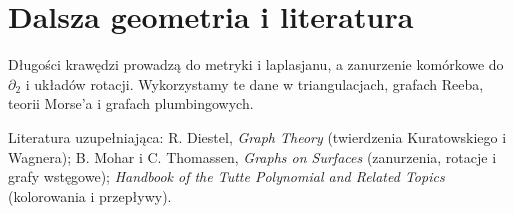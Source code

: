 \section*{Dalsza geometria i literatura}
Długości krawędzi prowadzą do metryki i laplasjanu, a zanurzenie
komórkowe do $\partial_2$ i układów rotacji. Wykorzystamy te dane
w triangulacjach, grafach Reeba, teorii Morse'a i grafach plumbingowych.

Literatura uzupełniająca: R. Diestel, \emph{Graph Theory}
(twierdzenia Kuratowskiego i Wagnera); B. Mohar i C. Thomassen,
\emph{Graphs on Surfaces} (zanurzenia, rotacje i grafy wstęgowe);
\emph{Handbook of the Tutte Polynomial and Related Topics}
(kolorowania i przepływy).


